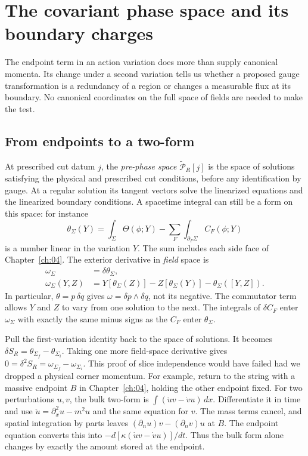 \chapter{The covariant phase space and its boundary charges}\label{ch:05}
The endpoint term in an action variation does more than supply canonical
momenta. Its change under a second variation tells us whether a proposed
gauge transformation is a redundancy of a region or changes a measurable
flux at its boundary. No canonical coordinates on the full space of fields
are needed to make the test.

\section{From endpoints to a two-form}
At prescribed cut datum $j$, the \emph{pre-phase space}
$\widetilde{\mathcal P}_R[j]$ is the space of solutions satisfying the physical
and prescribed cut conditions, before any identification by gauge. At a
regular solution its tangent vectors solve the linearized equations and the
linearized boundary conditions. A spacetime integral can still be a form on
this space: for instance
\[
 \theta_\Sigma(Y)=\int_\Sigma\Theta(\phi;Y)
      -\sum_F\int_{\partial_F\Sigma}C_F(\phi;Y)
\]
is a number linear in the variation $Y$. The sum includes each side face of
Chapter~\ref{ch:04}. The exterior derivative in \emph{field} space is
\begin{align}
 \omega_\Sigma&=\delta\theta_\Sigma,\nonumber\\
 \omega_\Sigma(Y,Z)&=Y[\theta_\Sigma(Z)]-Z[\theta_\Sigma(Y)]
                                      -\theta_\Sigma([Y,Z]).
 \label{eq:05-omega}
\end{align}
In particular, $\theta=p\,\delta q$ gives $\omega=\delta p\wedge\delta q$,
not its negative. The commutator term allows $Y$ and $Z$ to vary from one
solution to the next. The integrals of $\delta C_F$ enter $\omega_\Sigma$
with exactly the same minus signs as the $C_F$ enter $\theta_\Sigma$.

Pull the first-variation identity back to the space of solutions. It becomes
$\delta S_R=\theta_{\Sigma_f}-\theta_{\Sigma_i}$. Taking one more field-space derivative gives
$0=\delta^2S_R=\omega_{\Sigma_f}-\omega_{\Sigma_i}$. This proof of slice
independence would have failed had we dropped a physical corner momentum.
For example, return to the string with a massive endpoint $B$ in
Chapter~\ref{ch:04}, holding the other endpoint fixed. For two perturbations
$u,v$, the bulk two-form is $\int(\dot u v-\dot v u)\,dx$. Differentiate it
in time and use $\ddot u=\partial_x^2u-m^2u$ and the same equation for $v$.
The mass terms cancel, and spatial integration by parts leaves
$(\partial_n u)v-(\partial_n v)u$ at $B$. The endpoint equation converts
this into $-d[\kappa(\dot u v-\dot v u)]/dt$. Thus the bulk form alone
changes by exactly the amount stored at the endpoint.

